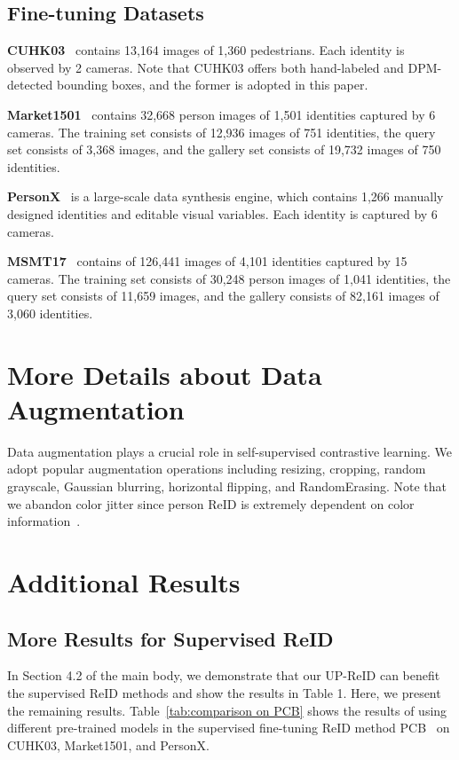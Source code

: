 \documentclass[10pt,twocolumn,letterpaper]{article}
\begin{document}
\subsection{Fine-tuning Datasets}
\noindent\textbf{CUHK03}~\cite{li2014deepreid} contains 13,164 images of 1,360 pedestrians. Each identity is observed by 2 cameras. Note that CUHK03 offers both hand-labeled and DPM-detected bounding boxes, and the former is adopted in this paper.

\noindent\textbf{Market1501}~\cite{zheng2015scalable} contains 32,668 person images of 1,501 identities captured by 6 cameras. The training set consists of 12,936 images of 751 identities, the query set consists of 3,368 images, and the gallery set consists of 19,732 images of 750 identities.

\noindent\textbf{PersonX}~\cite{sun2019dissecting} is a large-scale data synthesis engine, which contains 1,266 manually designed identities and editable visual variables. Each identity is captured by 6 cameras.

\noindent\textbf{MSMT17}~\cite{wei2018person} contains of 126,441 images of 4,101 identities captured by 15 cameras. The training set consists of 30,248 person images of 1,041 identities, the query set consists of 11,659 images, and the gallery consists of 82,161 images of 3,060 identities.


\section{More Details about Data Augmentation}
Data augmentation plays a crucial role in self-supervised contrastive learning. We adopt popular augmentation operations including resizing, cropping, random grayscale, Gaussian blurring, horizontal flipping, and RandomErasing. Note that we abandon color jitter since person ReID is extremely dependent on color information~\cite{fu2021unsupervised}.


\section{Additional Results}

\subsection{More Results for Supervised ReID}
In Section 4.2 of the main body, we demonstrate that our UP-ReID can benefit the supervised ReID methods and show the results in Table 1. Here, we present the remaining results. Table~\ref{tab:comparison on PCB} shows the results of using different pre-trained models in the supervised fine-tuning ReID method PCB~\cite{sun2018beyond} on CUHK03, Market1501, and PersonX.
\end{document}

